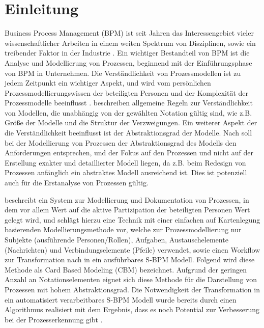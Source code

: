 %
%
% 
% 
% 

\chapter{Einleitung}
\label{cha:einleitung}
Business Process Management (BPM) ist seit Jahren das Interessengebiet vieler wissenschaftlicher Arbeiten in einem weiten Spektrum von Disziplinen, sowie ein treibender Faktor in der Industrie \cite{vanderAalst2016}. Ein wichtiger Bestandteil von BPM ist die Analyse und Modellierung von Prozessen, beginnend mit der Einführungsphase von BPM in Unternehmen. Die Verständlichkeit von Prozessmodellen ist zu jedem Zeitpunkt ein wichtiger Aspekt, und wird vom persönlichen Prozessmodellierungswissen der beteiligten Personen und der Komplexität der Prozessmodelle beeinflusst \cite{reijers_study_2011}. \citet{MENDLING2010127} beschreiben allgemeine Regeln zur Verständlichkeit von Modellen, die unabhängig von der gewählten Notation gültig sind, wie z.B. Größe der Modelle und die Struktur der Verzweigungen. Ein weiterer Aspekt der die Verständlichkeit beeinflusst ist der Abstraktionsgrad der Modelle. Nach \citet{vanderAalst2016} soll bei der Modellierung von Prozessen der Abstraktionsgrad des Modells den Anforderungen entsprechen, und der Fokus auf den Prozessen und nicht auf der Erstellung exakter und detaillierter Modell liegen, da z.B. beim Redesign von Prozessen anfänglich ein abstraktes Modell ausreichend ist. Dies ist potenziell auch für die Erstanalyse von Prozessen gültig. 

\citet{Oppl:2015:ASB:2723839.2723841} beschreibt ein System zur Modellierung und Dokumentation von Prozessen, in dem vor allem Wert auf die aktive Partizipation der beteiligten Personen Wert gelegt wird, und schlägt hierzu eine Technik mit einer einfachen auf Kartenlegung basierenden Modellierungsmethode vor, welche zur Prozessmodellierung nur Subjekte (ausführende Personen/Rollen), Aufgaben, Austauschelemente (Nachrichten) und Verbindungselemente (Pfeile) verwendet, sowie einen Workflow zur Transformation nach in ein ausführbares S-BPM Modell. Folgend wird diese Methode als Card Based Modeling (CBM) bezeichnet. Aufgrund der geringen Anzahl an Notationselementen eignet sich diese Methode für die Darstellung von Prozessen mit hohem Abstraktionsgrad. Die Notwendigkeit der Transformation in ein automatisiert verarbeitbares S-BPM Modell wurde bereits durch einen Algorithmus realisiert mit dem Ergebnis, dass es noch Potential zur Verbesserung bei der Prozesserkennung gibt \cite{max}. 


